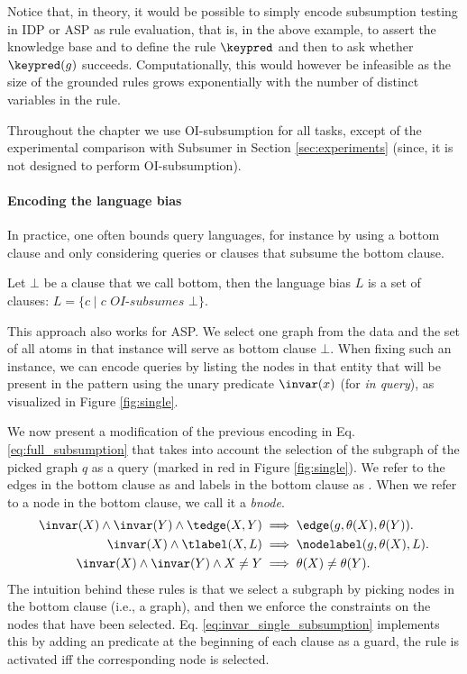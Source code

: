 Notice that, in theory, it would be possible to simply encode subsumption testing 
in IDP or ASP as rule evaluation, that is, in the above example, to assert the knowledge base and to define the rule $\keypred$ and then to ask whether $\keypred(g)$ succeeds. 
Computationally, this would however be infeasible as the size of the grounded rules 
grows exponentially with the number of distinct variables in the rule.

Throughout the chapter we use OI-subsumption for all tasks, except of the experimental comparison with Subsumer in Section \ref{sec:experiments} (since, it is not designed to perform OI-subsumption).

\paragraph{Encoding the language bias}
In practice, one often bounds query languages, for instance by using a bottom clause and only considering queries or clauses that subsume the bottom clause. 

\begin{definition}
  Let $\bot$ be a clause that we call bottom, then the language bias $L$ is a set of clauses: $L = \{ c \mid c \textit{ OI-subsumes } \bot\}$.
\end{definition}

This approach also works for ASP. We select one graph from the data and the set of all atoms in that instance will serve as bottom clause $\bot$. When fixing such an instance, we can encode queries by listing the nodes in that entity that will be present in the pattern using the unary predicate $\invar(x)$ (for \textit{in query}), as visualized in Figure \ref{fig:single}.

We now present a modification of the previous encoding in Eq. \ref{eq:full_subsumption} that takes into account the selection of the subgraph of the picked graph $q$ as a query (marked in red in Figure \ref{fig:single}). We refer to the edges in the bottom clause as \tedge and labels in the bottom clause as \tlabel. When we refer to a node in the bottom clause, we call it a \textit{bnode}.
\begin{equation}
\begin{aligned}
  \invar(X) \wedge \invar(Y) \wedge \tedge(X,Y) &\implies \edge(g,\theta(X), \theta(Y)).  \\
  \invar(X) \wedge \tlabel(X,L) &\implies \nodelabel(g,\theta(X),L). \\
  \invar(X) \wedge \invar(Y) \wedge X \neq Y &\implies \theta(X) \neq \theta(Y).
\end{aligned}
  \label{eq:invar_single_subsumption}
\end{equation}
The intuition behind these rules is that we select a subgraph by picking nodes in the bottom clause (i.e., a graph), and then we enforce the constraints on the nodes that have been selected. Eq. \ref{eq:invar_single_subsumption} implements this by adding an \invar predicate at the beginning of each clause as a guard, the rule is activated iff the corresponding node is selected.

